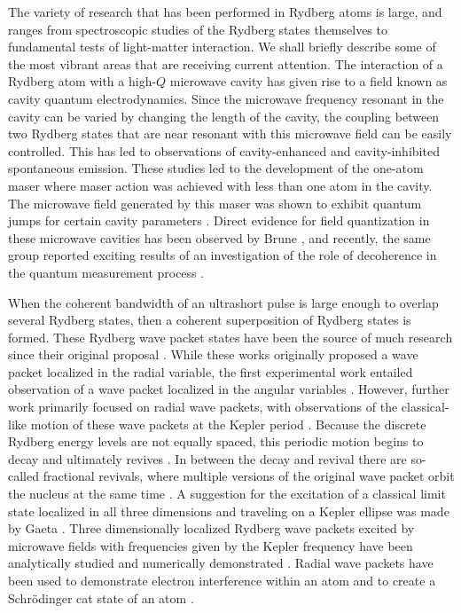 The variety of research that has been performed in Rydberg atoms is large, and
ranges from spectroscopic studies of the Rydberg states themselves to
fundamental tests of light-matter interaction.  We shall briefly describe some
of the most vibrant areas that are receiving current attention.  The
interaction of a Rydberg atom with a high-$Q$ microwave cavity has given rise to
a field known as cavity quantum electrodynamics.  Since the microwave frequency
resonant in the cavity can be varied by changing the length of the cavity, the
coupling between two Rydberg states that are near resonant with this microwave
field can be easily controlled.  This has led to observations of
cavity-enhanced \cite{Goy:83} and cavity-inhibited \cite{Hulet:85} spontaneous
emission.  These studies led to the development of the one-atom maser
\cite{Meschede:85} where maser action was achieved with less than one atom in
the cavity.  The microwave field generated by this maser was shown to exhibit
quantum jumps for certain cavity parameters \cite{Benson:94}.  Direct evidence
for field quantization in these microwave cavities has been observed by Brune
\etal \cite{Brune:96a}, and recently,  the same group reported exciting results
of an investigation of the role of decoherence in the quantum measurement
process \cite{Brune:96b}.

When the coherent bandwidth of an ultrashort pulse is large enough to overlap
several Rydberg states, then a coherent superposition of Rydberg states is
formed. These Rydberg wave packet states have been the source of much research
since their original proposal \cite{Parker:86,Alber:86}.  While these works
originally proposed a wave packet localized in the radial variable,
the first experimental work entailed observation of a wave packet localized in
the angular variables \cite{Yeazell:87,Yeazell:88}.  However, further work
primarily focused on radial wave packets, with observations of the
classical-like motion of these wave packets at the Kepler period
\cite{Wolde:88,Yeazell:89}.  Because the discrete Rydberg energy levels are not
equally spaced, this periodic motion begins to decay and ultimately revives
\cite{Yeazell:90}.  In between the decay and revival there are so-called
fractional revivals, where multiple versions of the original wave packet orbit
the nucleus at the same time
\cite{Averbukh:89,Yeazell:91,Meacher:91}.  A suggestion for the excitation of a
classical limit state localized in all three dimensions and traveling on a
Kepler ellipse was made by Gaeta \etal \cite{Gaeta:94}. 
Three dimensionally localized Rydberg wave packets excited by microwave
fields with frequencies given by the Kepler frequency have been analytically
studied \cite{Birula:94} and numerically demonstrated \cite{Kalinski:95}. Radial
wave packets have been used to demonstrate electron interference
within an atom \cite{Noel:95} and to create a Schr\"{o}dinger cat state of an
atom \cite{Noel:96}.


